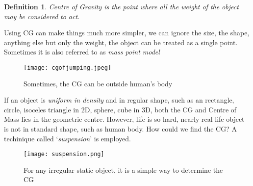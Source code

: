 \documentclass[a4paper]{tufte-handout}
\newtheorem{definition}[theorem]{Definition}%
\begin{document}
\begin{definition}
Centre of Gravity is the point where all the weight of the object may be considered to act.
\end{definition}

Using CG can make things much more simpler, we can ignore the size, the shape, anything else but only the weight, the object can be treated as a single point. Sometimes it is also referred to as \emph{mass point model}
\begin{figure}
\texttt{[image: cgofjumping.jpeg]}
\caption{Sometimes, the CG can be outside human's body}
\end{figure}

If an object is \emph{uniform in density} and in regular shape, such as an rectangle, circle, isoceles triangle in 2D, sphere, cube in 3D, both the CG and Centre of Mass lies in the geometric centre. However, life is so hard, nearly real life object is not in standard shape, such as human body. How could we find the CG? A techinique called `\emph{suspension}' is employed.
\begin{figure}[h]
\texttt{[image: suspension.png]}
\caption{For any irregular static object, it is a simple way to determine the CG}
\end{figure}
\end{document}
